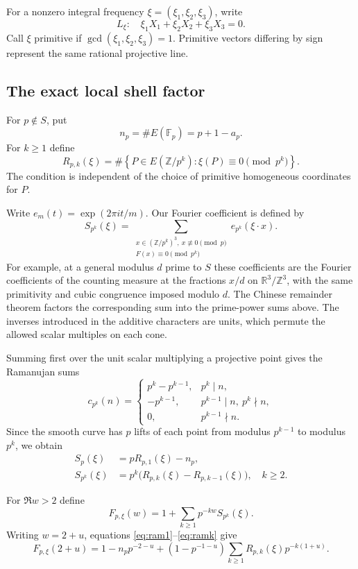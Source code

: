 \documentclass[11pt]{article}
\begin{document}
For a nonzero integral frequency
$\xi=(\xi_1,\xi_2,\xi_3)$, write
\[
L_\xi:\quad \xi_1X_1+\xi_2X_2+\xi_3X_3=0.
\]
Call $\xi$ primitive if
$\gcd(\xi_1,\xi_2,\xi_3)=1$.
Primitive vectors differing by sign represent
the same rational projective line.

\subsection{The exact local shell factor}

For $p\notin S$, put
\[
n_p=\#E(\mathbb F_p)=p+1-a_p.
\]
For $k\geq1$ define
\[
R_{p,k}(\xi)=
\#\left\{
P\in E(\mathbb Z/p^k):
\xi(P)\equiv0\pmod{p^k}
\right\}.
\]
The condition is independent of the choice of
primitive homogeneous coordinates for $P$.

Write $e_m(t)=\exp(2\pi it/m)$. Our Fourier coefficient is defined by
\[
 S_{p^k}(\xi)=\sum_{\substack{x\in(\mathbb Z/p^k)^3,\ x\not\equiv0\pmod p\\
 F(x)\equiv0\pmod{p^k}}} e_{p^k}(\xi\cdot x).
\]
For example, at a general modulus $d$ prime to $S$ these coefficients
are the Fourier coefficients of the counting measure at the fractions
$x/d$ on $\mathbb R^3/\mathbb Z^3$, with the same primitivity and cubic
congruence imposed modulo $d$. The Chinese remainder theorem factors
the corresponding sum into the prime-power sums above. The inverses
introduced in the additive characters are units, which permute the
allowed scalar multiples on each cone.

Summing first over the unit scalar multiplying
a projective point gives the Ramanujan sums
\[
c_{p^k}(n)=
\begin{cases}
p^k-p^{k-1},&p^k\mid n,\\
-p^{k-1},&p^{k-1}\mid n,\ p^k\nmid n,\\
0,&p^{k-1}\nmid n.
\end{cases}
\]
Since the smooth curve has $p$ lifts of each
point from modulus $p^{k-1}$ to modulus $p^k$,
we obtain
\begin{align}
S_p(\xi)&=pR_{p,1}(\xi)-n_p,
\label{eq:ram1}\\
S_{p^k}(\xi)
&=p^k\bigl(R_{p,k}(\xi)-R_{p,k-1}(\xi)\bigr),
\quad k\geq2.
\label{eq:ramk}
\end{align}

For $\Re w>2$ define
\[
F_{p,\xi}(w)=
1+\sum_{k\geq1}p^{-kw}S_{p^k}(\xi).
\]
Writing $w=2+u$, equations
\eqref{eq:ram1}--\eqref{eq:ramk} give
\begin{equation}\label{eq:local-R}
F_{p,\xi}(2+u)
=
1-n_pp^{-2-u}
+(1-p^{-1-u})
\sum_{k\geq1}R_{p,k}(\xi)p^{-k(1+u)}.
\end{equation}
\end{document}
